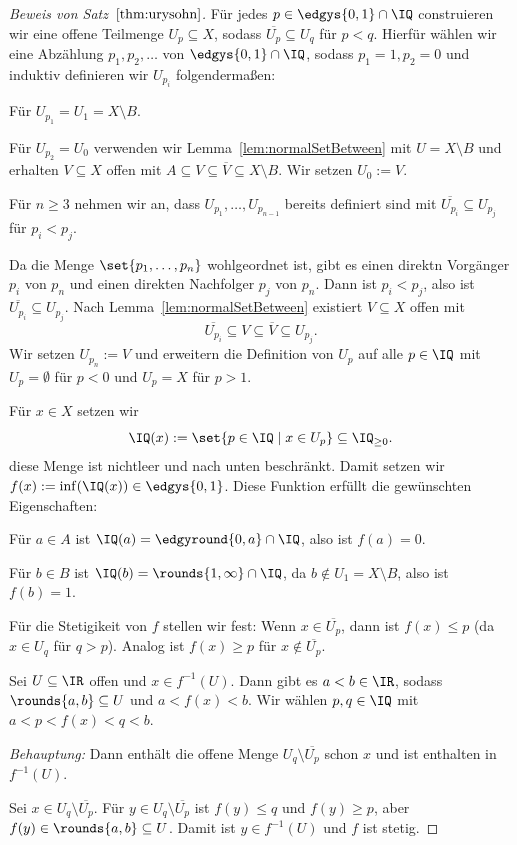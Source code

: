 \documentclass[language=ngerman]{TemplateLecture} %
\begin{document}
\begin{proof}[Beweis von Satz~$\ref{thm:urysohn}$]
    Für jedes $p \in \edgys{0,1} \cap \IQ$ construieren wir eine offene Teilmenge $U_p \subseteq X$, sodass $\overline{U_p} \subseteq U_q$ für $p < q$. Hierfür wählen wir eine Abzählung $p_1, p_2, \ldots$ von $\edgys{0,1} \cap \IQ$, sodass $p_1 = 1, p_2 = 0$ und induktiv definieren wir $U_{p_i}$ folgendermaßen:
    
    Für $U_{p_1} = U_1 = X \setminus B$.

    Für $U_{p_2} = U_0$ verwenden wir Lemma~\ref{lem:normalSetBetween} mit $U = X \setminus B$ und erhalten $V \subseteq X$ offen mit $A \subseteq V \subseteq \overline{V} \subseteq X \setminus B$. Wir setzen $U_0 := V$.

    Für $n \geq 3$ nehmen wir an, dass $U_{p_1}, \ldots, U_{p_{n-1}}$ bereits definiert sind mit $\overline{U_{p_i}} \subseteq U_{p_j}$ für $p_i < p_j$.

    Da die Menge $\set{p_1, \ldots, p_n}$ wohlgeordnet ist, gibt es einen direktn Vorgänger $p_i$ von $p_n$ und einen direkten Nachfolger $p_j$ von $p_n$. Dann ist $p_i < p_j$, also ist $\overline{U_{p_i}} \subseteq U_{p_j}$. Nach Lemma~\ref{lem:normalSetBetween} existiert $V \subseteq X$ offen mit
    \begin{equation*}
        \overline{U_{p_i}} \subseteq V \subseteq \overline{V} \subseteq U_{p_j}.
    \end{equation*}
    Wir setzen $U_{p_n} := V$ und erweitern die Definition von $U_p$ auf alle $p \in \IQ$ mit $U_p = \emptyset$ für $p < 0$ und $U_p = X$ für $p > 1$.

    Für $x \in X$ setzen wir
    \begin{equation*}
        \IQ(x) := \set{p \in \IQ \mid x \in U_p} \subseteq \IQ_{\geq 0}.
    \end{equation*}
    diese Menge ist nichtleer und nach unten beschränkt. Damit setzen wir $f(x) := \inf (\IQ(x)) \in \edgys{0,1}$. Diese Funktion erfüllt die gewünschten Eigenschaften:

    Für $a \in A$ ist $\IQ(a) = \edgyround{0,a} \cap \IQ$, also ist $f(a) = 0$.

    Für $b \in B$ ist $\IQ(b) = \rounds{1,\infty} \cap \IQ$, da $b \notin U_1 = X \setminus B$, also ist $f(b) = 1$.

    Für die Stetigikeit von $f$ stellen wir fest: Wenn $x \in \overline{U_p}$, dann ist $f(x) \leq p$ (da $x \in U_q$ für $q > p$). Analog ist $f(x) \geq p$ für $x \notin \overline{U_p}$.

    Sei $U \subseteq \IR$ offen und $x \in f^{-1}(U)$. Dann gibt es $a < b \in \IR$, sodass $\rounds{a,b} \subseteq U$ und $a < f(x) < b$. Wir wählen $p, q \in \IQ$ mit $a < p < f(x) < q < b$. 
    
    \emph{Behauptung:} Dann enthält die offene Menge $U_q \setminus \overline{U_p}$ schon $x$ und ist enthalten in $f^{-1}(U)$.

    Sei $x \in U_q \setminus \overline{U_p}$. Für $y \in U_q \setminus \overline{U_p}$ ist $f(y) \leq q$ und $f(y) \geq p$, aber $f(y) \in \rounds{a,b} \subseteq U$. Damit ist $y \in f^{-1}(U)$ und $f$ ist stetig.
\end{proof}
\end{document}
